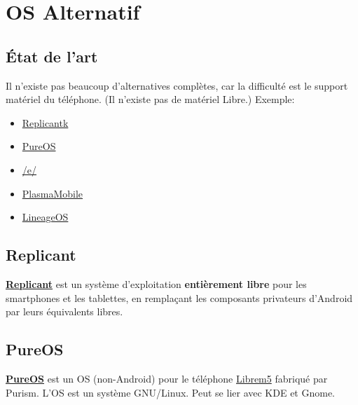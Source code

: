 \documentclass[aspectratio=169]{beamer}
\begin{document}

\section{OS Alternatif}

\begin{frame}
\begin{center}
\huge{\color{cvp}{OS Alternatif}}
\end{center}
\end{frame}

\subsection{État de l'art}
\begin{frame}
Il n'existe pas beaucoup d'alternatives complètes, car la difficulté est le support matériel du téléphone. (Il n'existe pas de matériel Libre.)\newline
\newline
Exemple:
\begin{itemize}
	\item \href{https://www.replicant.us}{Replicantk}
	\item \href{https://www.pureos.net}{PureOS}
	\item \href{https://e.foundation}{/e/}
	\item \href{https://www.plasma-mobile.org}{PlasmaMobile}
	\item \href{https://lineageos.org}{LineageOS}
\end{itemize}
\end{frame}

\subsection{Replicant}
\begin{frame}
\href{https://fr.wikipedia.org/wiki/Replicant_\%28syst\%C3\%A8me_d\%27exploitation\%29}{\textbf{Replicant}} est un système d'exploitation \textbf{entièrement libre} pour les smartphones et les tablettes, en remplaçant les composants privateurs d'Android par leurs équivalents libres.
\end{frame}

\subsection{PureOS}
\begin{frame}
\href{https://puri.sm/products/librem-5/pureos-mobile/}{\textbf{PureOS}} est un OS (non-Android) pour le téléphone \href{https://puri.sm/products/librem-5/}{Librem5} fabriqué par Purism.\newline
\newline
L'OS est un système GNU/Linux.\newline
Peut se lier avec KDE et Gnome.
\end{frame}
\end{document}
